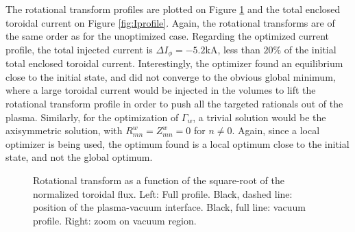 \documentclass[my_thesis.tex]{subfiles}
\begin{document}
The rotational transform profiles are plotted on Figure \ref{fig:iota_profile} and the total enclosed toroidal current on Figure \ref{fig:Iprofile}. Again, the rotational transforms are of the same order as for the unoptimized case. Regarding the optimized current profile, the total injected current is $\Delta I_\phi=-5.2$kA, less than $20\%$ of the initial total enclosed toroidal current. Interestingly, the optimizer found an equilibrium close to the initial state, and did not converge to the obvious global minimum, where a large toroidal current would be injected in the volumes to lift the rotational transform profile in order to push all the targeted rationals out of the plasma. Similarly, for the optimization of $\Gamma_w$, a trivial solution would be the axisymmetric solution, with $R^w_{mn}=Z^w_{mn}=0$ for $n\neq 0$. Again, since a local optimizer is being used, the optimum found is a local optimum close to the initial state, and not the global optimum.

\begin{figure}
    \centering
    \hfill
    \hfill
    \hfill
    \caption{Rotational transform as a function of the square-root of the normalized toroidal flux. Left: Full profile. Black, dashed line: position of the plasma-vacuum interface. Black, full line: vacuum profile. Right: zoom on vacuum region.}
    \label{fig:iota_profile}
\end{figure}
\end{document}
